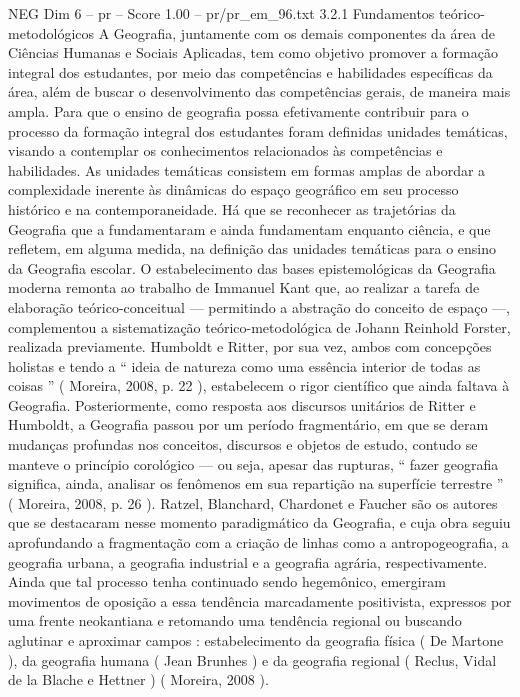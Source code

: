 \begin{textsample}{NEG Dim 6 – pr – Score 1.00 – pr/pr\_em\_96.txt}  \label{ex:f6_neg_264}
3.2.1 Fundamentos teórico-metodológicos A Geografia, juntamente com os demais componentes da área de Ciências Humanas e Sociais Aplicadas, tem como objetivo promover a formação integral dos estudantes, por meio das competências e habilidades específicas da área, além de buscar o desenvolvimento das competências gerais, de maneira mais ampla.
Para que o ensino de geografia possa efetivamente contribuir para o processo da formação integral dos estudantes foram definidas unidades temáticas, visando a contemplar os conhecimentos relacionados às competências e habilidades.
As unidades temáticas consistem em formas amplas de abordar a complexidade inerente às dinâmicas do espaço geográfico em seu processo histórico e na contemporaneidade.
Há que se reconhecer as trajetórias da Geografia que a fundamentaram e ainda fundamentam enquanto ciência, e que refletem, em alguma medida, na definição das unidades temáticas para o ensino da Geografia escolar.
O estabelecimento das bases epistemológicas da Geografia moderna remonta ao trabalho de Immanuel Kant que, ao realizar a tarefa de elaboração teórico-conceitual — permitindo a abstração do conceito de espaço —, complementou a sistematização teórico-metodológica de Johann Reinhold Forster, realizada previamente.
Humboldt e Ritter, por sua vez, ambos com concepções holistas e tendo a “ ideia de natureza como uma essência interior de todas as coisas ” ( Moreira, 2008, p. 22 ), estabelecem o rigor científico que ainda faltava à Geografia.
Posteriormente, como resposta aos discursos unitários de Ritter e Humboldt, a Geografia passou por um período fragmentário, em que se deram mudanças profundas nos conceitos, discursos e objetos de estudo, contudo se manteve o princípio corológico — ou seja, apesar das rupturas, “ fazer geografia significa, ainda, analisar os fenômenos em sua repartição na superfície terrestre ” ( Moreira, 2008, p. 26 ).
Ratzel, Blanchard, Chardonet e Faucher são os autores que se destacaram nesse momento paradigmático da Geografia, e cuja obra seguiu aprofundando a fragmentação com a criação de linhas como a antropogeografia, a geografia urbana, a geografia industrial e a geografia agrária, respectivamente.
Ainda que tal processo tenha continuado sendo hegemônico, emergiram movimentos de oposição a essa tendência marcadamente positivista, expressos por uma frente neokantiana e retomando uma tendência regional ou buscando aglutinar e aproximar campos : estabelecimento da geografia física ( De Martone ), da geografia humana ( Jean Brunhes ) e da geografia regional ( Reclus, Vidal de la Blache e Hettner ) ( Moreira, 2008 ).

\end{textsample}
